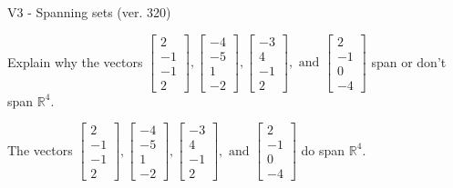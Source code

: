\begin{exercise}
  \begin{exerciseTitle}V3 - Spanning sets (ver. 320)\end{exerciseTitle}
  \begin{exerciseStatement}
    Explain why the vectors \(\left[\begin{array}{r}
2 \\
-1 \\
-1 \\
2
\end{array}\right] , \left[\begin{array}{r}
-4 \\
-5 \\
1 \\
-2
\end{array}\right] , \left[\begin{array}{r}
-3 \\
4 \\
-1 \\
2
\end{array}\right] , \text{ and } \left[\begin{array}{r}
2 \\
-1 \\
0 \\
-4
\end{array}\right]\) span or don't span \(\mathbb{R}^4\). 
	


  \end{exerciseStatement}
  \begin{exerciseAnswer}
   The vectors \(\left[\begin{array}{r}
2 \\
-1 \\
-1 \\
2
\end{array}\right] , \left[\begin{array}{r}
-4 \\
-5 \\
1 \\
-2
\end{array}\right] , \left[\begin{array}{r}
-3 \\
4 \\
-1 \\
2
\end{array}\right] , \text{ and } \left[\begin{array}{r}
2 \\
-1 \\
0 \\
-4
\end{array}\right]\) 
  	 do  
	span \(\mathbb{R}^4\).
  


  \end{exerciseAnswer}
\end{exercise}